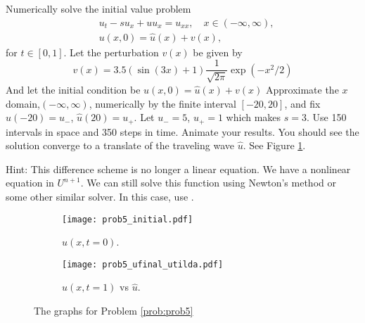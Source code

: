 \begin{problem}
\label{prob:prob5}
Numerically solve the initial value problem
\begin{align*}
	&{ } u_t -su_x + uu_x = u_{xx}, \quad x \in (-\infty,\infty),\\
	&{ } u(x,0) = \hat{u}(x)+v(x),
\end{align*}
for $t \in [0,1]$.
Let the perturbation $v(x)$ be given by
\[v(x) = 3.5(\sin{(3x)} + 1)\frac{1}{\sqrt{2\pi}} \exp{(-x^2/2)}\]
And let the initial condition be $u(x, 0) = \hat{u}(x) + v(x)$
Approximate the $x$ domain,$(-\infty, \infty)$, numerically by the finite interval $[-20,20]$, and fix $\hat{u}(-20) = u_-$, $\hat{u}(20) = u_+$. Let $u_- = 5$, $u_+ = 1$ which makes $s = 3$.
Use 150 intervals in space and 350 steps in time.
Animate your results.
You should see the solution converge to a translate of the traveling wave $\hat{u}$.
See Figure \ref{fig:prob5}.

Hint: This difference scheme is no longer a linear equation.
We have a nonlinear equation in $U^{n+1}$.
We can still solve this function using Newton's method or some other similar solver.
In this case, use .

\begin{figure}[H]
\centering
\begin{subfigure}{.49\textwidth}
\centering
\texttt{[image: prob5\_initial.pdf]}
\caption{$u(x,t=0)$.}
\end{subfigure}
%
\begin{subfigure}{.49\textwidth}
\centering
\texttt{[image: prob5\_ufinal\_utilda.pdf]}
\caption{$u(x,t = 1)$ vs $\hat{u}$.}
\end{subfigure}
\caption{The graphs for Problem \ref{prob:prob5}}
\label{fig:prob5}
\end{figure}
\end{problem}
